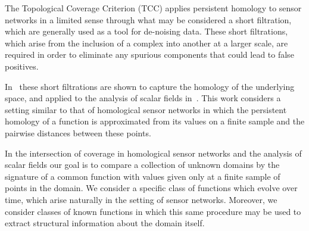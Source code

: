 The Topological Coverage Criterion (TCC) applies persistent homology to sensor networks in a limited sense through what may be considered a short filtration, which are generally used as a tool for de-noising data.
These short filtrations, which arise from the inclusion of a complex into another at a larger scale, are required in order to eliminate any spurious components that could lead to false positives.


In~\cite{chazal08towards} these short filtrations are shown to capture the homology of the underlying space, and applied to the analysis of scalar fields in~\cite{chazal09analysis}.
This work considers a setting similar to that of homological sensor networks in which the persistent homology of a function is approximated from its values on a finite sample and the pairwise distances between these points.

In the intersection of coverage in homological sensor networks and the analysis of scalar fields our goal is to compare a collection of unknown domains by the signature of a common function with values given only at a finite sample of points in the domain.
We consider a specific class of functions which evolve over time, which arise naturally in the setting of sensor networks.
Moreover, we consider classes of known functions in which this same procedure may be used to extract structural information about the domain itself.


%
